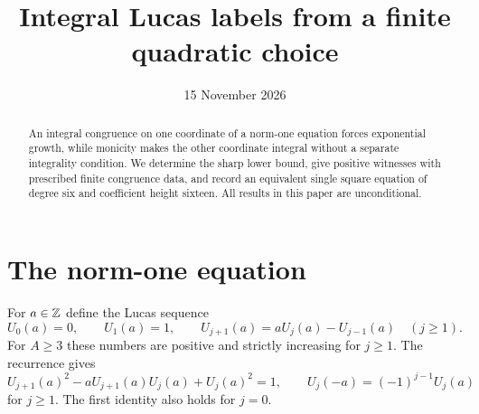 \documentclass[11pt,a4paper]{article}
\title{Integral Lucas labels from a finite quadratic choice}
\author{}\date{15 November 2026}
\begin{document}
\maketitle
\begin{abstract}
An integral congruence on one coordinate of a norm-one equation forces
exponential growth, while monicity makes the other coordinate integral
without a separate integrality condition. We determine the sharp lower
bound, give positive witnesses with prescribed finite congruence data,
and record an equivalent single square equation of degree six and
coefficient height sixteen. All results in this paper are unconditional.
\end{abstract}

\section{The norm-one equation}
For $a\in\mathbb Z$ define the Lucas sequence
\[
 U_0(a)=0,\qquad U_1(a)=1,\qquad
 U_{j+1}(a)=aU_j(a)-U_{j-1}(a)\quad(j\ge1).
\]
For $A\ge3$ these numbers are positive and strictly increasing for
$j\ge1$. The recurrence gives
\begin{equation}\label{eq:identities}
 U_{j+1}(a)^2-aU_{j+1}(a)U_j(a)+U_j(a)^2=1,
 \qquad U_j(-a)=(-1)^{j-1}U_j(a)
\end{equation}
for $j\ge1$. The first identity also holds for $j=0$.
\end{document}
